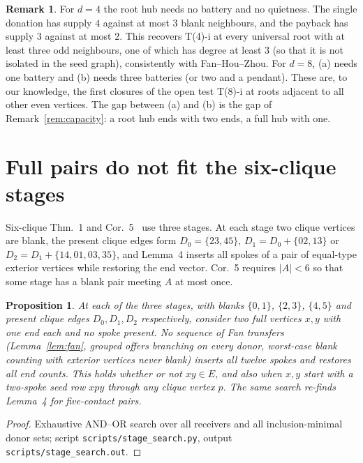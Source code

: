 \documentclass[11pt]{amsart}
\newtheorem{proposition}[theorem]{Proposition}
\theoremstyle{definition}
\newtheorem{remark}[theorem]{Remark}
\begin{document}
\begin{remark}
For $d=4$ the root hub needs no battery and no quietness. The single donation has supply $4$
against at most $3$ blank neighbours, and the payback has supply $3$ against at most $2$. This
recovers T(4)-i at every universal root with at least three odd neighbours, one of which has
degree at least $3$ (so that it is not isolated in the seed graph), consistently with
Fan--Hou--Zhou. For $d=8$, (a) needs
one battery and (b) needs three batteries (or two and a pendant). These are, to our knowledge, the
first closures of the open test T(8)-i at roots adjacent to all other even vertices. The gap
between (a) and (b) is the gap of Remark~\ref{rem:capacity}: a root hub ends with two ends, a full
hub with one.
\end{remark}

\section{Full pairs do not fit the six-clique stages}\label{sec:stage}

Six-clique Thm.~1 and Cor.~5~\cite{6CL} use three stages. At each stage two clique vertices are blank, the
present clique edges form $D_0=\{23,45\}$, $D_1=D_0+\{02,13\}$ or
$D_2=D_1+\{14,01,03,35\}$, and Lemma~4 inserts all spokes of a pair of equal-type exterior vertices
while restoring the end vector. Cor.~5 requires $|A|<6$ so that some stage has a blank pair
meeting $A$ at most once.

\begin{proposition}\label{prop:stage}
At each of the three stages, with blanks $\{0,1\}$, $\{2,3\}$, $\{4,5\}$ and present clique edges
$D_0,D_1,D_2$ respectively, consider two full vertices $x,y$ with one end each and no spoke
present. No sequence of Fan transfers (Lemma~\ref{lem:fan}, grouped offers branching on every
donor, worst-case blank counting with exterior vertices never blank) inserts all twelve spokes
and restores all end counts. This holds whether or not $xy\in E$, and also when $x,y$ start with a
two-spoke seed row $xpy$ through any clique vertex $p$. The same search re-finds Lemma~4 for
five-contact pairs.
\end{proposition}
\begin{proof}
Exhaustive AND--OR search over all receivers and all inclusion-minimal donor sets; script
\texttt{scripts/stage\_search.py}, output \texttt{scripts/stage\_search.out}.
\end{proof}
\end{document}
